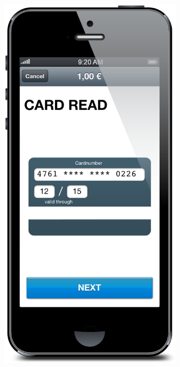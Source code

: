 \documentclass[a4paper, oneside]{csthesis}
\begin{document}
\begin{figure}
\begin{subfigure}[b]{0.22\textwidth}
                \label{fig:flow3}
        \end{subfigure}
        \begin{subfigure}[b]{0.22\textwidth}
                \centering
                \includegraphics[width=\textwidth]{figures/flow4.png}
                \label{fig:flow4}
        \end{subfigure}


\end{figure}
\end{document}
